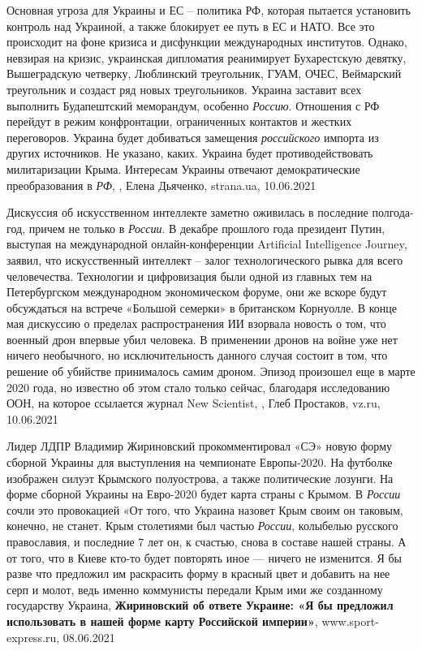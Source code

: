 Основная угроза для Украины и ЕС – политика РФ, которая пытается установить
контроль над Украиной, а также блокирует ее путь в ЕС и НАТО. Все это
происходит на фоне кризиса и дисфункции международных институтов. Однако,
невзирая на кризис, украинская дипломатия реанимирует Бухарестскую девятку,
Вышеградскую четверку, Люблинский треугольник, ГУАМ, ОЧЕС, Веймарский
треугольник и создаст ряд новых треугольников.  Украина заставит всех выполнить
Будапештский меморандум, особенно \emph{Россию}.  Отношения с РФ перейдут в режим
конфронтации, ограниченных контактов и жестких переговоров. Украина будет
добиваться замещения \emph{российского} импорта из других источников. Не указано,
каких. Украина будет противодействовать милитаризации Крыма. Интересам Украины
отвечают демократические преобразования в \emph{РФ},
, Елена Дьяченко, strana.ua, 10.06.2021

Дискуссия об искусственном интеллекте заметно оживилась в последние
полгода-год, причем не только в \emph{России}. В декабре прошлого года президент
Путин, выступая на международной онлайн-конференции Artificial Intelligence
Journey, заявил, что искусственный интеллект – залог технологического рывка для
всего человечества. Технологии и цифровизация были одной из главных тем на
Петербургском международном экономическом форуме, они же вскоре будут
обсуждаться на встрече «Большой семерки» в британском Корнуолле.  В конце мая
дискуссию о пределах распространения ИИ взорвала новость о том, что военный
дрон впервые убил человека. В применении дронов на войне уже нет ничего
необычного, но исключительность данного случая состоит в том, что решение об
убийстве принималось самим дроном. Эпизод произошел еще в марте 2020 года, но
известно об этом стало только сейчас, благодаря исследованию ООН, на которое
ссылается журнал New Scientist,
, Глеб Простаков, vz.ru, 10.06.2021

Лидер ЛДПР Владимир Жириновский прокомментировал «СЭ» новую форму сборной
Украины для выступления на чемпионате Европы-2020. На футболке изображен силуэт
Крымского полуострова, а также политические лозунги. На форме сборной Украины на Евро-2020
будет карта страны с Крымом. В \emph{России} сочли это провокацией «От того, что
Украина назовет Крым своим он таковым, конечно, не станет. Крым столетиями был
частью \emph{России}, колыбелью русского православия, и последние 7 лет он, к счастью,
снова в составе нашей страны. А от того, что в Киеве кто-то будет повторять
иное — ничего не изменится. Я бы разве что предложил им раскрасить форму в
красный цвет и добавить на нее серп и молот, ведь именно коммунисты передали
Крым ими же созданному государству Украина,
\textbf{Жириновский об ответе Украине: «Я бы предложил использовать в нашей форме карту Российской империи»},
www.sport-express.ru, 08.06.2021

